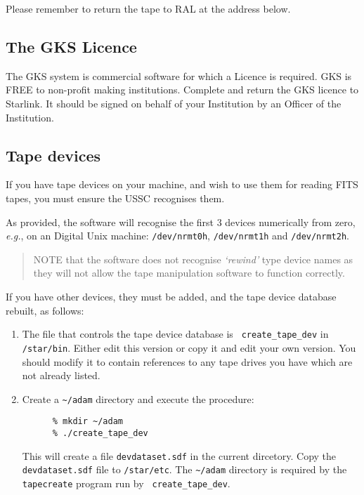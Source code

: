 Please remember to return the tape to RAL at the address below.

\subsection{The GKS Licence}
\label{s:setup:gks}

The GKS system is commercial software for which a Licence is required.
GKS is FREE to non-profit making institutions.  Complete and return the
GKS licence to Starlink.  It should be signed on behalf of your
Institution by an Officer of the Institution.

\subsection{Tape devices}
\label{s:setup:tapedev}

If you have tape devices on your machine, and wish to use them for reading
FITS tapes, you must ensure the USSC recognises them.

As provided, the software will recognise the first 3 devices numerically
from zero, {\em e.g.}, on an Digital Unix machine: {\tt /dev/nrmt0h},
{\tt /dev/nrmt1h} and {\tt /dev/nrmt2h}.

\begin{quote}
NOTE that the software does not recognise {\it `rewind'} type device
names as they will not allow the tape manipulation software to function
correctly.
\end{quote}

If you have other devices, they must be added, and the tape device database
rebuilt, as follows:

\begin{enumerate}

\item The file that controls the tape device database is {\tt
create\_tape\_dev} in {\tt /star/bin}.  Either edit this version or
copy it and edit your own version.  You should modify it to contain
references to any tape drives you have which are not already listed.

\item Create a \verb+~/adam+ directory and execute the procedure:

\begin{verbatim}
      % mkdir ~/adam
      % ./create_tape_dev
\end{verbatim}

This will create a file {\tt devdataset.sdf} in the current dircetory.
Copy the {\tt devdataset.sdf} file to {\tt /star/etc}.  The \verb+~/adam+
directory is required by the {\tt tapecreate} program run by {\tt
create\_tape\_dev}.

\end{enumerate}

